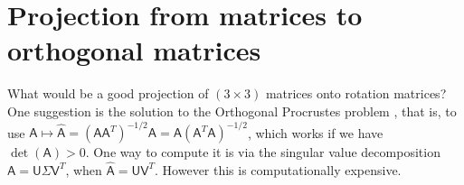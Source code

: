 \documentclass[reqno,12pt]{amsart}
\begin{document}
\section{Projection from matrices to orthogonal matrices}
\label{sec final note}

What would be a good projection of $(3 \times 3)$ matrices onto rotation matrices?  One suggestion is the solution to the Orthogonal Procrustes problem \cite{higham,wiki1}, that is, to use $\mathsf A \mapsto \widehat{\mathsf A} = (\mathsf A\mathsf A^T)^{-1/2} \mathsf A = \mathsf A (\mathsf A^T \mathsf A)^{-1/2}$, which works if we have $\det(\mathsf A) > 0$.  One way to compute it is via the singular value decomposition $\mathsf A = \mathsf U \mathsf \Sigma \mathsf V^T$, when $\widehat{\mathsf A} = \mathsf U\mathsf V^T$.  However this is computationally expensive.
\end{document}
